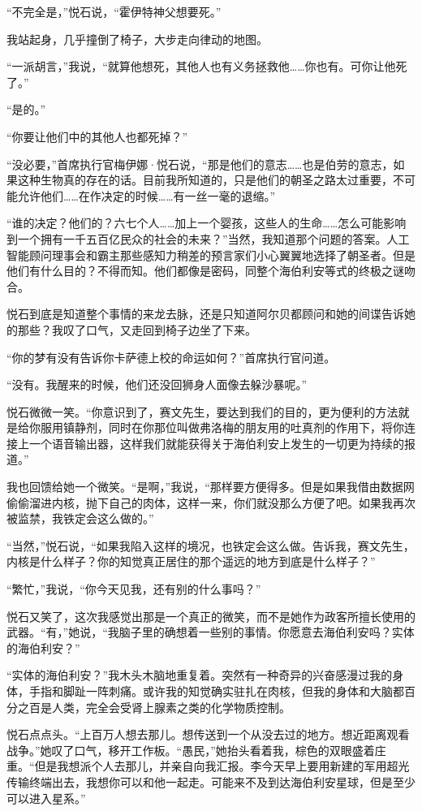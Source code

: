 \documentclass[AutoFakeBold=true]{book}
\begin{document}
``不完全是，''悦石说，``霍伊特神父想要死。''

我站起身，几乎撞倒了椅子，大步走向律动的地图。

``一派胡言，''我说，``就算他想死，其他人也有义务拯救他……你也有。可你让他死了。''

``是的。''

``你要让他们中的其他人也都死掉？''

``没必要，''首席执行官梅伊娜·悦石说，``那是他们的意志……也是伯劳的意志，如果这种生物真的存在的话。目前我所知道的，只是他们的朝圣之路太过重要，不可能允许他们……在作决定的时候……有一丝一毫的退缩。''

``谁的决定？他们的？六七个人……加上一个婴孩，这些人的生命……怎么可能影响到一个拥有{\kaishu 一千五百亿}民众的社会的未来？''当然，我知道那个问题的答案。人工智能顾问理事会和霸主那些感知力稍差的预言家们小心翼翼地选择了朝圣者。但是他们有什么目的？不得而知。他们都像是密码，同整个海伯利安等式的终极之谜吻合。

悦石到底是知道整个事情的来龙去脉，还是只知道阿尔贝都顾问和她的间谍告诉她的那些？我叹了口气，又走回到椅子边坐了下来。

``你的梦有没有告诉你卡萨德上校的命运如何？''首席执行官问道。

``没有。我醒来的时候，他们还没回狮身人面像去躲沙暴呢。''

悦石微微一笑。``你意识到了，赛文先生，要达到我们的目的，更为便利的方法就是给你服用镇静剂，同时在你那位叫做弗洛梅的朋友用的吐真剂的作用下，将你连接上一个语音输出器，这样我们就能获得关于海伯利安上发生的一切更为持续的报道。''

我也回馈给她一个微笑。``是啊，''我说，``那样要方便得多。但是如果我借由数据网偷偷溜进内核，抛下自己的肉体，这样一来，你们就没那么方便了吧。如果我再次被监禁，我铁定会这么做的。''

``当然，''悦石说，``如果我陷入这样的境况，也铁定会这么做。告诉我，赛文先生，内核是什么样子？你的知觉真正居住的那个遥远的地方到底是什么样子？''

``繁忙，''我说，``你今天见我，还有别的什么事吗？''

悦石又笑了，这次我感觉出那是一个真正的微笑，而不是她作为政客所擅长使用的武器。``有，''她说，``我脑子里的确想着一些别的事情。你愿意去海伯利安吗？{\kaishu 实体的}海伯利安？''

``实体的海伯利安？''我木头木脑地重复着。突然有一种奇异的兴奋感漫过我的身体，手指和脚趾一阵刺痛。或许我的知觉确实驻扎在肉核，但我的身体和大脑都百分之百是人类，完全会受肾上腺素之类的化学物质控制。

悦石点点头。``上百万人想去那儿。想传送到一个从没去过的地方。想近距离观看战争。''她叹了口气，移开工作板。``愚民，''她抬头看着我，棕色的双眼盛着庄重。``但是我想派个人去那儿，并亲自向我汇报。李今天早上要用新建的军用超光传输终端出去，我想你可以和他一起走。可能来不及到达海伯利安星球，但是至少可以进入星系。''
\end{document}
